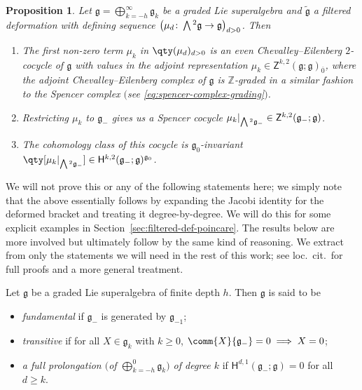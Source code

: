 \documentclass[10pt,a4paper]{amsart}
\numberwithin{equation}{section}
\newtheorem{Proposition}[Theorem]{Proposition}
 { \theoremstyle{definition}
\newtheorem{Definition}[Theorem]{Definition}
\newtheorem{Note}[Theorem]{Note}
\newtheorem{Example}[Theorem]{Example}
\newtheorem{Remark}[Theorem]{Remark} }
\newcommand{\fg}{\mathfrak{g}}
\newcommand{\ZZ}{\mathbb{Z}}
\newcommand{\ssH}{\mathsf{H}}
\newcommand{\ssZ}{\mathsf{Z}}
\newcommand{\fgtilde}{\widetilde{\mathfrak{g}}}
\newcommand{\Wedge}{\mathchoice{{\textstyle\bigwedge}}{\bigwedge}{\bigwedge}{\bigwedge}}	%
\newcommand{\1}{\mathbbm{1}}
\begin{document}

\begin{Proposition}\label{prop:def-seq-spencer-cocycle}
	Let $\fg=\bigoplus_{k=-h}^\infty\fg_k$ be a graded Lie superalgebra and $\fgtilde$ a filtered deformation with defining sequence $\bigl(\mu_d\colon\Wedge^2\fg\to\fg\bigr)_{d> 0}$. Then
	\begin{enumerate}\itemsep=0pt
		\item[$(1)$] {\rm\cite[\emph{Proposition}~2.1]{Cheng1998}} The first non-zero term $\mu_k$ in $\qty(\mu_d)_{d> 0}$ is an even Chevalley--Eilenberg $2$-cocycle of $\fg$ with values in the adjoint representation
		$\mu_k\in\ssZ^{k,2}(\fg;\fg)_{\overline{0}}$,	
		where the adjoint Chevalley--Eilenberg complex of $\fg$ is $\ZZ$-graded in a similar fashion to the Spencer complex $($see \eqref{eq:spencer-complex-grading}$)$.
		\item[$(2)$] {\rm\cite[\emph{Proposition}~2.2]{Cheng1998}} Restricting $\mu_k$ to $\fg_-$ gives us a Spencer cocycle
		$\mu_k|_{\Wedge^2\fg_-}\in\ssZ^{k,2}(\fg_-;\fg)$.
		\item[$(3)$] {\rm\cite[\emph{Proposition}~2.2]{Cheng1998}} The cohomology class of this cocycle is $\fg_0$-invariant
			$\qty[\mu_k|_{\Wedge^2\fg_-}]\in \ssH^{k,2}(\fg_-;\fg)^{\fg_0}$.
	\end{enumerate}
\end{Proposition}
We will not prove this or any of the following statements here; we simply note that the above essentially follows by expanding the Jacobi identity for the deformed bracket and treating it degree-by-degree. We will do this for some explicit examples in Section~\ref{sec:filtered-def-poincare}. The results below are more involved but ultimately follow by the same kind of reasoning. We extract from \cite{Cheng1998} only the statements we will need in the rest of this work; see loc.\ cit.\ for full proofs and a more general treatment.

\begin{Definition}\label{def:fund-trans-prolong}
	Let $\fg$ be a graded Lie superalgebra of finite depth $h$. Then $\fg$ is said to be
	\begin{itemize}\itemsep=0pt
	\item \emph{fundamental} if $\fg_-$ is generated by $\fg_{-1}$;
	\item \emph{transitive} if for all $X\in\fg_k$ with $k\geq 0$, $\comm{X}{\fg_-}=0\implies X=0$;
	\item \emph{a full prolongation $\big($of $\bigoplus_{k=-h}^0\fg_k\big)$ of degree $k$} if $\ssH^{d,1}(\fg_-;\fg)=0$ for all $d\geq k$.
	\end{itemize}
\end{Definition}
\end{document}

